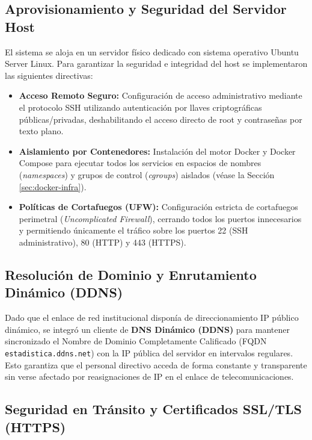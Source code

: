 \subsection{Aprovisionamiento y Seguridad del Servidor Host}

El sistema se aloja en un servidor físico dedicado con sistema operativo Ubuntu Server Linux. Para garantizar la seguridad e integridad del host se implementaron las siguientes directivas:

\begin{itemize}
    \item \textbf{Acceso Remoto Seguro:} Configuración de acceso administrativo mediante el protocolo SSH utilizando autenticación por llaves criptográficas públicas/privadas, deshabilitando el acceso directo de root y contraseñas por texto plano.
    \item \textbf{Aislamiento por Contenedores:} Instalación del motor Docker y Docker Compose para ejecutar todos los servicios en espacios de nombres (\textit{namespaces}) y grupos de control (\textit{cgroups}) aislados (véase la Sección \ref{sec:docker-infra}).
    \item \textbf{Políticas de Cortafuegos (UFW):} Configuración estricta de cortafuegos perimetral (\textit{Uncomplicated Firewall}), cerrando todos los puertos innecesarios y permitiendo únicamente el tráfico sobre los puertos 22 (SSH administrativo), 80 (HTTP) y 443 (HTTPS).
\end{itemize}

\subsection{Resolución de Dominio y Enrutamiento Dinámico (DDNS)}

Dado que el enlace de red institucional disponía de direccionamiento IP público dinámico, se integró un cliente de \textbf{DNS Dinámico (DDNS)} para mantener sincronizado el Nombre de Dominio Completamente Calificado (FQDN \texttt{estadistica.ddns.net}) con la IP pública del servidor en intervalos regulares. Esto garantiza que el personal directivo acceda de forma constante y transparente sin verse afectado por reasignaciones de IP en el enlace de telecomunicaciones.

\subsection{Seguridad en Tránsito y Certificados SSL/TLS (HTTPS)}

